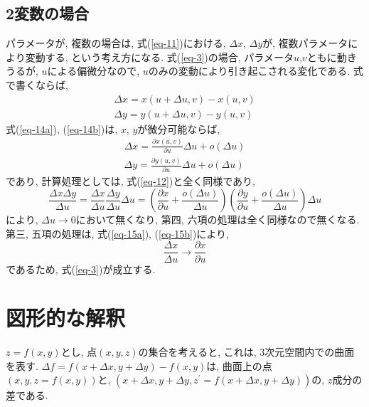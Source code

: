 \documentclass{jsarticle}
\begin{document}
\subsection{2変数の場合}
パラメータが, 複数の場合は, 式(\ref{eq-11})における, $\Delta x$, $\Delta y$が, 複数パラメータにより変動する, という考え方になる. 
式(\ref{eq-3})の場合, パラメータ$u$,$v$ともに動きうるが, $u$による偏微分なので, $u$のみの変動により引き起こされる変化である. 式で書くならば, 
\begin{subequations}
  \begin{eqnarray}
    \Delta x = x(u + \Delta u, v) - x(u, v) \label{eq-14a}\\
    \Delta y = y(u + \Delta u, v) - y(u, v) \label{eq-14b}
  \end{eqnarray}
\end{subequations}
式(\ref{eq-14a}), (\ref{eq-14b})は, $x$, $y$が微分可能ならば, 
\begin{subequations}
  \begin{eqnarray}
    \Delta x = \frac{\partial x(u, v)}{\partial u} \Delta u + o(\Delta u)  \label{eq-15a} \\
    \Delta y = \frac{\partial y(u, v)}{\partial u} \Delta u + o(\Delta u)  \label{eq-15b}
  \end{eqnarray}
\end{subequations}
であり, 計算処理としては, 式(\ref{eq-12})と全く同様であり,
\[
  \frac{\Delta x \Delta y}{\Delta u}
  = \frac{\Delta x}{\Delta u}\frac{\Delta y}{\Delta u} \Delta u
  = \left(\frac{\partial x}{\partial u} + \frac{o(\Delta u)}{\Delta u}\right)
  \left(\frac{\partial y}{\partial u} + \frac{o(\Delta u)}{\Delta u}\right) \Delta u
\]
により, $\Delta u \to 0$において無くなり, 
第四, 六項の処理は全く同様なので無くなる. 
第三, 五項の処理は, 式(\ref{eq-15a}), (\ref{eq-15b})により, 
\[
  \frac{\Delta x}{\Delta u} \to \frac{\partial x}{\partial u}
\]
であるため, 式(\ref{eq-3})が成立する. 

\section{図形的な解釈}
$z = f(x, y)$とし, 点$(x, y, z)$の集合を考えると, これは, 3次元空間内での曲面を表す. 
$\Delta f = f(x + \Delta x, y + \Delta y) - f(x, y)$は, 曲面上の点$(x, y, z = f(x, y))$と, $(x + \Delta x, y + \Delta y, z^\prime = f(x + \Delta x, y + \Delta y))$の, $z$成分の差である. 
\end{document}
